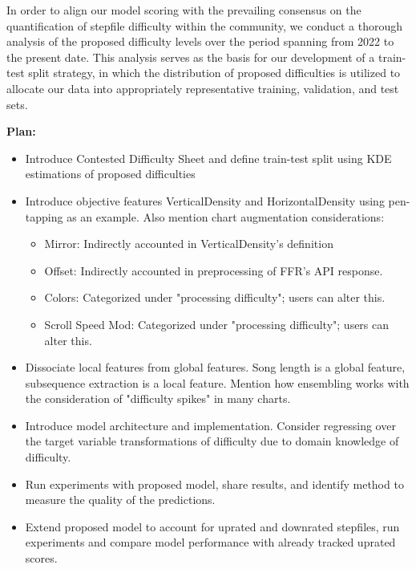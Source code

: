 \vspace{2mm}


In order to align our model scoring with the prevailing consensus on the quantification of stepfile difficulty within the community, we conduct a thorough analysis of the proposed difficulty levels over the period spanning from 2022 to the present date. This analysis serves as the basis for our development of a train-test split strategy, in which the distribution of proposed difficulties is utilized to allocate our data into appropriately representative training, validation, and test sets.




\textbf{Plan:}
\begin{itemize}
	      	      
	      \item{Introduce Contested Difficulty Sheet and define train-test split using KDE estimations of proposed difficulties}
	      	      
	      \item{Introduce objective features VerticalDensity and HorizontalDensity using pen-tapping as an example. Also mention chart augmentation considerations:}
	      \begin{itemize}
	      	\item Mirror: Indirectly accounted in VerticalDensity's definition
	      	\item Offset: Indirectly accounted in preprocessing of FFR's API response.
	      	\item Colors: Categorized under "processing difficulty"; users can alter this.
	      	\item Scroll Speed Mod: Categorized under "processing difficulty"; users can alter this.
	      \end{itemize}
	      	      
	\item Dissociate local features from global features. Song length is a global feature, subsequence extraction is a local feature. Mention how ensembling works with the consideration of "difficulty spikes" in many charts.
	      	      
	\item Introduce model architecture and implementation. Consider regressing over the target variable transformations of difficulty due to domain knowledge of difficulty.
	      	      
	\item Run experiments with proposed model, share results, and identify method to measure the quality of the predictions.
	      	      
	\item Extend proposed model to account for uprated and downrated stepfiles, run experiments and compare model performance with already tracked uprated scores.
	      	          
\end{itemize}

